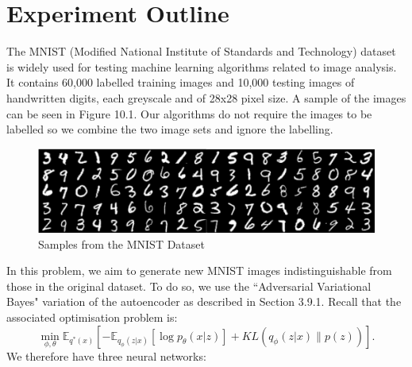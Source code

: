 \documentclass[honours,12pt]{unswthesis}
\newcommand{\E}{\mathbb{E}}
\numberwithin{equation}{section}
\theoremstyle{definition}
\begin{document}
\section{Experiment Outline}
The MNIST (Modified National Institute of Standards and Technology) dataset is widely used for testing machine learning algorithms related to image analysis. It contains 60,000 labelled training images and 10,000 testing images of handwritten digits, each greyscale and of 28x28 pixel size. A sample of the images can be seen in Figure 10.1. Our algorithms do not require the images to be labelled so we combine the two image sets and ignore the labelling.
\begin{figure}[b]
\includegraphics[width=\linewidth]{mnist-digits-small.png}
\caption{Samples from the MNIST Dataset}
\end{figure}
In this problem, we aim to generate new MNIST images indistinguishable from those in the original dataset. To do so, we use the ``Adversarial Variational Bayes" variation of the autoencoder as described in Section 3.9.1. Recall that the associated optimisation problem is:
\[\min_{\phi,\theta}\E_{q^*(x)}\left[-\E_{q_\phi(z|x)}[\log p_\theta(x|z)]+KL(q_\phi(z|x)\|p(z))\right].\]
We therefore have three neural networks:
\end{document}
